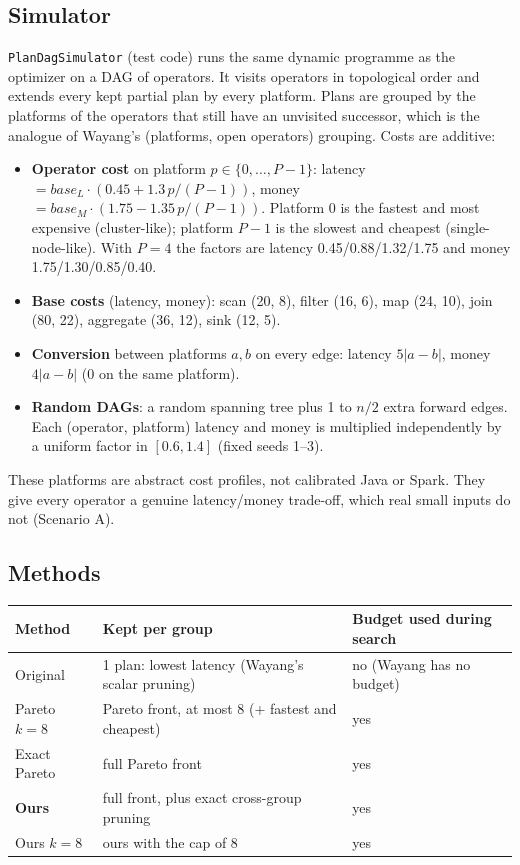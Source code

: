 \documentclass[10pt,a4paper]{article}
\begin{document}
\subsection{Simulator}
\texttt{PlanDagSimulator} (test code) runs the same dynamic programme as the optimizer on a DAG of operators. It
visits operators in topological order and extends every kept partial plan by every platform. Plans are grouped by
the platforms of the operators that still have an unvisited successor, which is the analogue of Wayang's (platforms,
open operators) grouping. Costs are additive:
\begin{itemize}
\item \textbf{Operator cost} on platform $p\in\{0,\dots,P-1\}$: latency $= \mathit{base}_L \cdot (0.45 + 1.3\,p/(P-1))$,
money $= \mathit{base}_M \cdot (1.75 - 1.35\,p/(P-1))$. Platform 0 is the fastest and most expensive (cluster-like);
platform $P-1$ is the slowest and cheapest (single-node-like). With $P=4$ the factors are latency
0.45/0.88/1.32/1.75 and money 1.75/1.30/0.85/0.40.
\item \textbf{Base costs} (latency, money): scan (20, 8), filter (16, 6), map (24, 10), join (80, 22),
aggregate (36, 12), sink (12, 5).
\item \textbf{Conversion} between platforms $a,b$ on every edge: latency $5|a-b|$, money $4|a-b|$ (0 on the same
platform).
\item \textbf{Random DAGs}: a random spanning tree plus 1 to $n/2$ extra forward edges. Each (operator, platform)
latency and money is multiplied independently by a uniform factor in $[0.6, 1.4]$ (fixed seeds 1--3).
\end{itemize}
These platforms are abstract cost profiles, not calibrated Java or Spark. They give every operator a genuine
latency/money trade-off, which real small inputs do not (Scenario A).

\subsection{Methods}
\begin{center}\small
\begin{tabular}{@{}lll@{}}
\toprule
Method & Kept per group & Budget used during search\\
\midrule
Original & 1 plan: lowest latency (Wayang's scalar pruning) & no (Wayang has no budget)\\
Pareto $k{=}8$ & Pareto front, at most 8 (+ fastest and cheapest) & yes\\
Exact Pareto & full Pareto front & yes\\
\textbf{Ours} & full front, plus exact cross-group pruning & yes\\
Ours $k{=}8$ & ours with the cap of 8 & yes\\
\bottomrule
\end{tabular}
\end{center}
\end{document}
